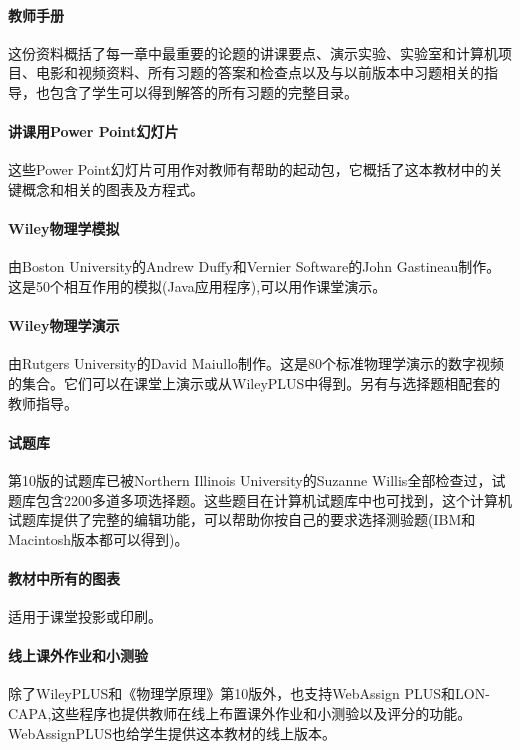 \paragraph{教师手册}这份资料概括了每一章中最重要的论题的讲课要点、演示实验、实验室和计算机项目、电影和视频资料、所有习题的答案和检查点以及与以前版本中习题相关的指导，也包含了学生可以得到解答的所有习题的完整目录。

\paragraph{讲课用Power Point幻灯片}这些Power Point幻灯片可用作对教师有帮助的起动包，它概括了这本教材中的关键概念和相关的图表及方程式。

\paragraph{Wiley物理学模拟}由Boston University的Andrew Duffy和Vernier Software的John Gastineau制作。这是50个相互作用的模拟(Java应用程序),可以用作课堂演示。

\paragraph{Wiley物理学演示}由Rutgers University的David Maiullo制作。这是80个标准物理学演示的数字视频的集合。它们可以在课堂上演示或从WileyPLUS中得到。另有与选择题相配套的教师指导。

\paragraph{试题库}第10版的试题库已被Northern Illinois University的Suzanne Willis全部检查过，试题库包含2200多道多项选择题。这些题目在计算机试题库中也可找到，这个计算机试题库提供了完整的编辑功能，可以帮助你按自己的要求选择测验题(IBM和Macintosh版本都可以得到)。

\paragraph{教材中所有的图表}适用于课堂投影或印刷。


\paragraph{线上课外作业和小测验}除了WileyPLUS和《物理学原理》第10版外，也支持WebAssign PLUS和LON-CAPA,这些程序也提供教师在线上布置课外作业和小测验以及评分的功能。WebAssignPLUS也给学生提供这本教材的线上版本。

